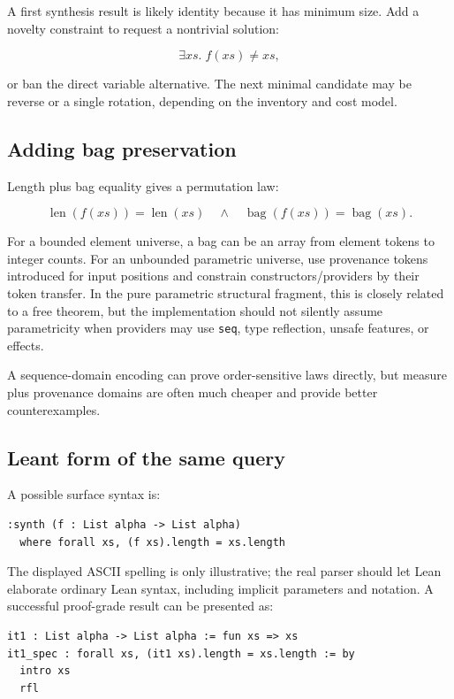 \documentclass[11pt,oneside]{article}
\newcommand{\code}[1]{\texttt{#1}}
\begin{document}
A first synthesis result is likely identity because it has minimum size. Add a novelty
constraint to request a nontrivial solution:

\[
  \exists xs.\; f(xs)\neq xs,
\]

or ban the direct variable alternative. The next minimal candidate may be reverse or a
single rotation, depending on the inventory and cost model.

\subsection{Adding bag preservation}

Length plus bag equality gives a permutation law:

\[
  \operatorname{len}(f(xs))=\operatorname{len}(xs)
  \quad\land\quad
  \operatorname{bag}(f(xs))=\operatorname{bag}(xs).
\]

For a bounded element universe, a bag can be an array from element tokens to integer
counts. For an unbounded parametric universe, use provenance tokens introduced for
input positions and constrain constructors/providers by their token transfer. In the
pure parametric structural fragment, this is closely related to a free theorem, but the
implementation should not silently assume parametricity when providers may use
\code{seq}, type reflection, unsafe features, or effects.

A sequence-domain encoding can prove order-sensitive laws directly, but measure plus
provenance domains are often much cheaper and provide better counterexamples.

\subsection{Leant form of the same query}

A possible surface syntax is:

\begin{lstlisting}[language=Lean]
:synth (f : List alpha -> List alpha)
  where forall xs, (f xs).length = xs.length
\end{lstlisting}

The displayed ASCII spelling is only illustrative; the real parser should let Lean
elaborate ordinary Lean syntax, including implicit parameters and notation. A successful
proof-grade result can be presented as:

\begin{lstlisting}[language=Lean]
it1 : List alpha -> List alpha := fun xs => xs
it1_spec : forall xs, (it1 xs).length = xs.length := by
  intro xs
  rfl
\end{lstlisting}
\end{document}
